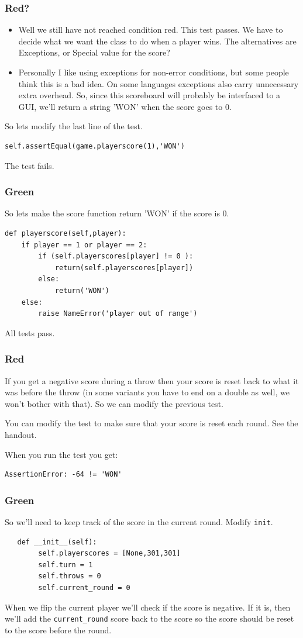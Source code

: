 \documentclass{beamer}
\begin{document}
\begin{frame}
\frametitle{Red?}
\begin{itemize}
\item Well we still have not reached condition red. This test passes. We
have to decide what we want the class to do when a player wins. 
The alternatives are  Exceptions, or  Special value for the score?
\item Personally I like using exceptions for non-error conditions, but some
people think this is a bad idea. On some languages exceptions also
carry unnecessary extra overhead. So, since this scoreboard will
probably be interfaced to a GUI, we'll return a string 'WON' when the
score goes to 0.
\end{itemize}
\end{frame}
\begin{frame}[fragile]
So lets modify the last line of the test.
\begin{lstlisting}
self.assertEqual(game.playerscore(1),'WON')  
\end{lstlisting}

The test fails. 
\end{frame}
\begin{frame}[fragile]
\frametitle{Green}
So lets make the score function return 'WON' if the score is 0.
\begin{lstlisting}
def playerscore(self,player):
    if player == 1 or player == 2:
        if (self.playerscores[player] != 0 ): 
            return(self.playerscores[player])
        else:
            return('WON')
    else:
        raise NameError('player out of range')
 \end{lstlisting}
All tests pass.
  
\end{frame}
\begin{frame}[fragile]
\frametitle{Red}
If you get a negative score during a throw then your score is reset
back to what it was before the throw (in some variants you have to end
on a double as well, we won't bother with that).  So we can modify the
previous test.

You can modify the test to make sure that your score is reset each
round. See the handout.

When you run the test you get:
\begin{verbatim}
AssertionError: -64 != 'WON'
\end{verbatim}
  
\end{frame}
\begin{frame}[fragile]
\frametitle{Green}
So we'll need to keep track of the score in the current round.
Modify {\tt init}.
\begin{lstlisting}
   def __init__(self):
        self.playerscores = [None,301,301]
        self.turn = 1
        self.throws = 0
        self.current_round = 0
\end{lstlisting}
When we flip the current player we'll check if the score is negative. If it
is, then we'll add the {\tt current\_round} score back to the score so the
score should be reset to the score before the round.
  
\end{frame}
\end{document}
